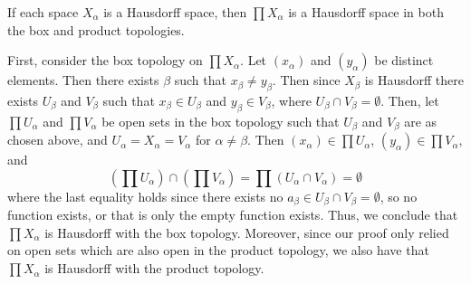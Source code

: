 \documentclass[12pt, a4paper, twoside, openright, titlepage]{book}
\begin{document}
\begin{thm}{}{}
    If each space $X_{\alpha}$ is a Hausdorff space, then $\prod X_{\alpha}$ is a Hausdorff space in both the box and product topologies.
\end{thm}
\begin{proof*}{}{}
    First, consider the box topology on $\prod X_{\alpha}$. Let $(x_{\alpha})$ and $(y_{\alpha})$ be distinct elements. Then there exists $\beta$ such that $x_{\beta} \neq y_{\beta}$. Then since $X_{\beta}$ is Hausdorff there exists $U_{\beta}$ and $V_{\beta}$ such that $x_{\beta} \in U_{\beta}$ and $y_{\beta} \in V_{\beta}$, where $U_{\beta}\cap V_{\beta} = \emptyset$. Then, let $\prod U_{\alpha}$ and $\prod V_{\alpha}$ be open sets in the box topology such that $U_{\beta}$ and $V_{\beta}$ are as chosen above, and $U_{\alpha} = X_{\alpha} = V_{\alpha}$ for $\alpha \neq \beta$. Then $(x_{\alpha}) \in \prod U_{\alpha}$, $(y_{\alpha}) \in \prod V_{\alpha}$, and \begin{equation*}
        \left(\prod U_{\alpha}\right)\cap \left(\prod V_{\alpha}\right) = \prod (U_{\alpha}\cap V_{\alpha}) = \emptyset
    \end{equation*}
    where the last equality holds since there exists no $a_{\beta} \in U_{\beta}\cap V_{\beta} = \emptyset$, so no function exists, or that is only the empty function exists. Thus, we conclude that $\prod X_{\alpha}$ is Hausdorff with the box topology. Moreover, since our proof only relied on open sets which are also open in the product topology, we also have that $\prod X_{\alpha}$ is Hausdorff with the product topology.
\end{proof*}
\end{document}
